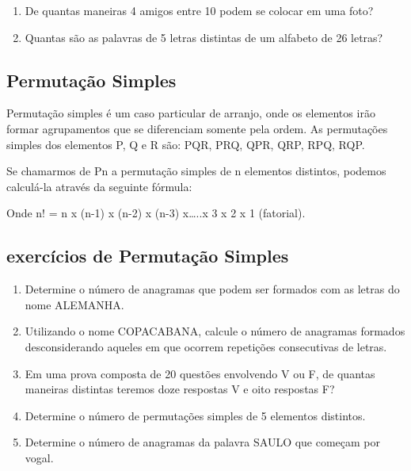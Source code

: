\begin{multicols*}{2}
\begin{enumerate}
		\item De quantas maneiras 4 amigos entre 10 podem se colocar em uma foto?
		
		\item Quantas são as palavras de 5 letras distintas de um alfabeto de 26 letras?
		
		\end{enumerate}

\subsection{Permutação Simples}

Permutação simples é um caso particular de arranjo, onde os elementos irão formar agrupamentos que se diferenciam somente pela ordem. As permutações simples dos elementos P, Q e R são: PQR, PRQ, QPR, QRP, RPQ, RQP.

Se chamarmos de Pn a permutação simples de n elementos distintos, podemos calculá-la através da seguinte fórmula:


Onde n! = n x (n-1) x (n-2)  x (n-3) x…..x 3 x 2 x 1 (fatorial).

\subsection{exercícios de Permutação Simples}

		\begin{enumerate}

		\item Determine o número de anagramas que podem ser formados com as letras do nome ALEMANHA.
		
		\item Utilizando o nome COPACABANA, calcule o número de anagramas formados desconsiderando aqueles em que ocorrem repetições consecutivas de letras.
		
		\item Em uma prova composta de 20 questões envolvendo V ou F, de quantas maneiras distintas teremos doze respostas V e oito respostas F?
		
		\item Determine o número de permutações simples de 5 elementos distintos.
		
		\item Determine o número de anagramas da palavra SAULO que começam por vogal.

		\end{enumerate}


\end{multicols*}
